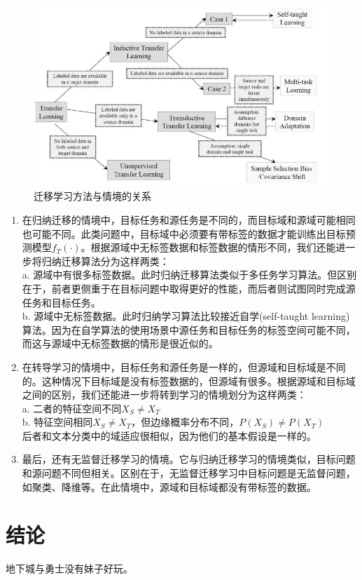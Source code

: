 \documentclass[10pt,journal,compsoc]{IEEEtran}
\begin{document}
\begin{figure}[!ht]
\centering
\includegraphics[width=30pc]{img/survey_fig1.jpg}
\caption{迁移学习方法与情境的关系}
\label{fig:survey_method}
\end{figure}


\begin{enumerate}
\item 在归纳迁移的情境中，目标任务和源任务是不同的，而目标域和源域可能相同也可能不同。此类问题中，目标域中必须要有带标签的数据才能训练出目标预测模型$f_T(\cdot)$。根据源域中无标签数据和标签数据的情形不同，我们还能进一步将归纳迁移算法分为这样两类：\\
a. 源域中有很多标签数据。此时归纳迁移算法类似于多任务学习算法。但区别在于，前者更侧重于在目标问题中取得更好的性能，而后者则试图同时完成源任务和目标任务。\\
b. 源域中无标签数据。此时归纳学习算法比较接近自学(self-taught learning)算法。因为在自学算法的使用场景中源任务和目标任务的标签空间可能不同，而这与源域中无标签数据的情形是很近似的。

\item 在转导学习的情境中，目标任务和源任务是一样的，但源域和目标域是不同的。这种情况下目标域是没有标签数据的，但源域有很多。根据源域和目标域之间的区别，我们还能进一步将转到学习的情境划分为这样两类：\\
a. 二者的特征空间不同$X_S \ne X_T$\\
b. 特征空间相同$X_S \ne X_T$，但边缘概率分布不同，$P(X_S) \ne P(X_T)$\\
后者和文本分类中的域适应很相似，因为他们的基本假设是一样的。
\item 最后，还有无监督迁移学习的情境。它与归纳迁移学习的情境类似，目标问题和源问题不同但相关。区别在于，无监督迁移学习中目标问题是无监督问题，如聚类、降维等。在此情境中，源域和目标域都没有带标签的数据。
\end{enumerate}




\section{结论}

地下城与勇士没有妹子好玩。



\end{document}
